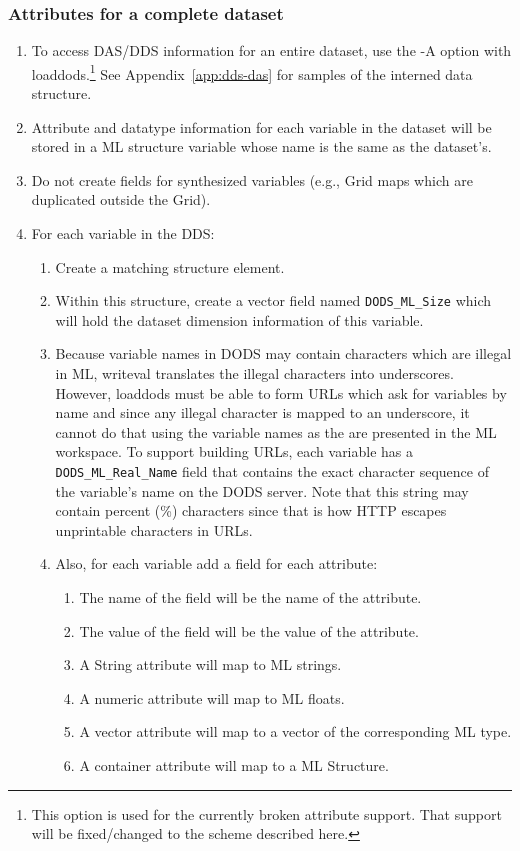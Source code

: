 \documentclass{article}
\begin{document}
\subsubsection{Attributes for a complete dataset}
\label{sec:complete-dataset}
\begin{enumerate}
\item To access DAS/DDS information for an entire dataset, use the -A option
  with loaddods.\footnote{This option is used for the currently broken
    attribute support. That support will be fixed/changed to the scheme
    described here.} See Appendix~\ref{app:dds-das} for samples of
  the interned data structure.
\item Attribute and datatype information for each variable in the dataset will
   be stored in a ML structure variable whose name is the same as the
   dataset's.
\item Do not create fields for synthesized variables (e.g., Grid maps which
  are duplicated outside  the Grid).
\item For each variable in the DDS:
\begin{enumerate}
\item Create a matching structure element.
\item Within this structure, create a vector field named
  \texttt{DODS\_ML\_Size} which will hold the dataset dimension information
  of this variable.
\item Because variable names in DODS may contain characters which are illegal
  in ML, writeval translates the illegal characters into underscores.
  However, loaddods must be able to form URLs which ask for variables by name
  and since any illegal character is mapped to an underscore, it cannot do
  that using the variable names as the are presented in the ML workspace. To
  support building URLs, each variable has a \texttt{DODS\_ML\_Real\_Name}
  field that contains the exact character sequence of the variable's name on
  the DODS server. Note that this string may contain percent (\%) characters
  since that is how HTTP escapes unprintable characters in URLs.
\item Also, for each variable add a field for each attribute:
\begin{enumerate}
\item The name of the field will be the name of the attribute.
\item The value of the field will be the value of the attribute.
\item A String attribute will map to ML strings.
\item A numeric attribute will map to ML floats.
\item A vector attribute will map to a vector of the corresponding ML type.
\item A container attribute will map to a ML Structure.
\end{enumerate}
\end{enumerate}


\end{enumerate}
\end{document}
